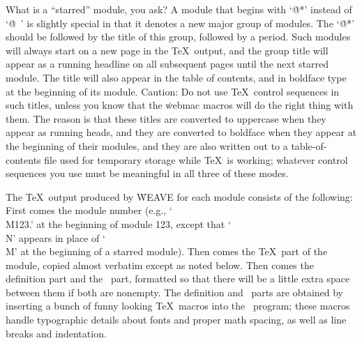 What is a ``starred'' module, you ask? A module that begins with `\.{@*}'
instead of `\.{@\ }' is slightly special in that it denotes a new major
group of modules. The `\.{@*}' should be followed by the title of this
group, followed by a period. Such modules will always start on a new page
in the \TeX\ output, and the group title will appear as a running headline
on all subsequent pages until the next starred module. The title will also
appear in the table of contents, and in boldface type at the beginning of
its module. Caution:  Do not use \TeX\ control sequences in such titles,
unless you know that the \.{webmac} macros will do the right thing with
them. The reason is that these titles are converted to uppercase when
they appear as running heads, and they are converted to boldface when they
appear at the beginning of their modules, and they are also written out to
a table-of-contents file used for temporary storage while \TeX\ is
working; whatever control sequences you use must be meaningful in all
three of these modes.

The \TeX\ output produced by \.{WEAVE} for each module consists of
the following: First comes the module number (e.g., `\.{\\M123.}'
at the beginning of module 123, except that `\.{\\N}' appears in place of
`\.{\\M}' at the beginning of a starred module). Then comes the
\TeX\ part of the module, copied almost verbatim except as noted
below. Then comes the definition part and the \PASCAL\ part, formatted
so that there will be a little extra space between them if both are
nonempty. The definition and \PASCAL\ parts are obtained by inserting
a bunch of funny looking \TeX\ macros into the \PASCAL\ program; these
macros handle typographic details about fonts and proper math spacing,
as well as line breaks and indentation.

